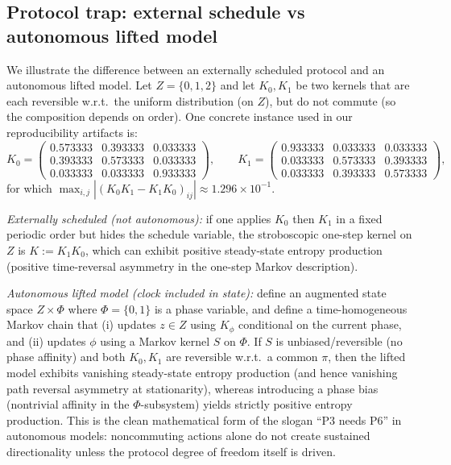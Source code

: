 \documentclass[11pt]{article}
\theoremstyle{remark}
\begin{document}
\subsection{Protocol trap: external schedule vs autonomous lifted model}
\label{subsec:ex:protocol-trap}

We illustrate the difference between an externally scheduled protocol and an autonomous lifted model.
Let $Z=\{0,1,2\}$ and let $K_0,K_1$ be two kernels that are each reversible w.r.t.\ the uniform distribution
(on $Z$), but do not commute (so the composition depends on order). One concrete instance used in our
reproducibility artifacts is:
\[
K_0=
\begin{pmatrix}
0.573333 & 0.393333 & 0.033333\\
0.393333 & 0.573333 & 0.033333\\
0.033333 & 0.033333 & 0.933333
\end{pmatrix},
\qquad
K_1=
\begin{pmatrix}
0.933333 & 0.033333 & 0.033333\\
0.033333 & 0.573333 & 0.393333\\
0.033333 & 0.393333 & 0.573333
\end{pmatrix},
\]
for which $\max_{i,j}|(K_0K_1-K_1K_0)_{ij}|\approx 1.296\times 10^{-1}$.

\emph{Externally scheduled (not autonomous):}
if one applies $K_0$ then $K_1$ in a fixed periodic order but hides the schedule variable, the
stroboscopic one-step kernel on $Z$ is $K:=K_1K_0$, which can exhibit positive steady-state entropy
production (positive time-reversal asymmetry in the one-step Markov description).

\emph{Autonomous lifted model (clock included in state):}
define an augmented state space $Z\times \Phi$ where $\Phi=\{0,1\}$ is a phase variable, and define a
time-homogeneous Markov chain that (i) updates $z\in Z$ using $K_\phi$ conditional on the current phase,
and (ii) updates $\phi$ using a Markov kernel $S$ on $\Phi$. If $S$ is unbiased/reversible (no phase
affinity) and both $K_0,K_1$ are reversible w.r.t.\ a common $\pi$, then the lifted model exhibits
vanishing steady-state entropy production (and hence vanishing path reversal asymmetry at stationarity),
whereas introducing a phase bias (nontrivial affinity in the $\Phi$-subsystem) yields strictly positive
entropy production. This is the clean mathematical form of the slogan “P3 needs P6” in autonomous models:
noncommuting actions alone do not create sustained directionality unless the protocol degree of freedom
itself is driven.
\end{document}
